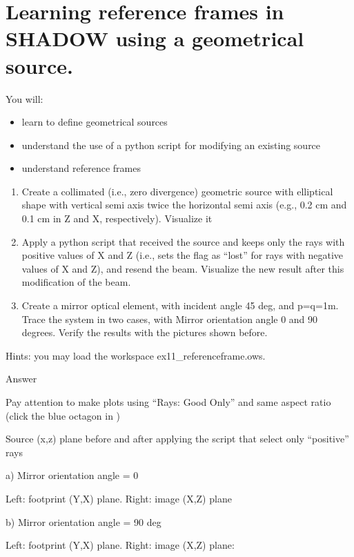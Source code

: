 \documentclass[]{article}
\providecommand{\tightlist}{%
  \setlength{\itemsep}{0pt}\setlength{\parskip}{0pt}}
\begin{document}
\section{Learning reference frames in SHADOW using a geometrical
source.}\label{learning-reference-frames-in-shadow-using-a-geometrical-source.}

You will:

\begin{itemize}
\tightlist
\item
  learn to define geometrical sources
\item
  understand the use of a python script for modifying an existing source
\item
  understand reference frames
\end{itemize}

\begin{enumerate}
\def\labelenumi{\roman{enumi})}
\tightlist
\item
  Create a collimated (i.e., zero divergence) geometric source with
  elliptical shape with vertical semi axis twice the horizontal semi
  axis (e.g., 0.2 cm and 0.1 cm in Z and X, respectively). Visualize it
\item
  Apply a python script that received the source and keeps only the rays
  with positive values of X and Z (i.e., sets the flag as ``lost'' for
  rays with negative values of X and Z), and resend the beam. Visualize
  the new result after this modification of the beam.
\item
  Create a mirror optical element, with incident angle 45 deg, and
  p=q=1m. Trace the system in two cases, with Mirror orientation angle 0
  and 90 degrees. Verify the results with the pictures shown before.
\end{enumerate}

Hints: you may load the workspace ex11\_referenceframe.ows.

Answer

Pay attention to make plots using ``Rays: Good Only'' and same aspect
ratio (click the blue octagon in )

Source (x,z) plane before and after applying the script that select only
``positive'' rays

a) Mirror orientation angle = 0

Left: footprint (Y,X) plane. Right: image (X,Z) plane

b) Mirror orientation angle = 90 deg

Left: footprint (Y,X) plane. Right: image (X,Z) plane:
\end{document}
